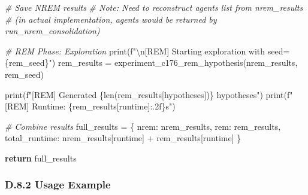 \documentclass[
]{article}
\newenvironment{Shaded}{}{}
\newcommand{\BuiltInTok}[1]{\textcolor[rgb]{0.00,0.50,0.00}{#1}}
\newcommand{\CharTok}[1]{\textcolor[rgb]{0.25,0.44,0.63}{#1}}
\newcommand{\CommentTok}[1]{\textcolor[rgb]{0.38,0.63,0.69}{\textit{#1}}}
\newcommand{\ControlFlowTok}[1]{\textcolor[rgb]{0.00,0.44,0.13}{\textbf{#1}}}
\newcommand{\NormalTok}[1]{#1}
\newcommand{\OperatorTok}[1]{\textcolor[rgb]{0.40,0.40,0.40}{#1}}
\newcommand{\SpecialCharTok}[1]{\textcolor[rgb]{0.25,0.44,0.63}{#1}}
\newcommand{\SpecialStringTok}[1]{\textcolor[rgb]{0.73,0.40,0.53}{#1}}
\newcommand{\StringTok}[1]{\textcolor[rgb]{0.25,0.44,0.63}{#1}}
\begin{document}
\begin{Shaded}
\begin{Highlighting}[]
    \CommentTok{\# Save NREM results}
    \CommentTok{\# Note: Need to reconstruct agents list from nrem\_results}
    \CommentTok{\# (in actual implementation, agents would be returned by run\_nrem\_consolidation)}

    \CommentTok{\# REM Phase: Exploration}
    \BuiltInTok{print}\NormalTok{(}\SpecialStringTok{f"}\CharTok{\textbackslash{}n}\SpecialStringTok{[REM] Starting exploration with seed=}\SpecialCharTok{\{}\NormalTok{rem\_seed}\SpecialCharTok{\}}\SpecialStringTok{"}\NormalTok{)}
\NormalTok{    rem\_results }\OperatorTok{=}\NormalTok{ experiment\_c176\_rem\_hypothesis(nrem\_results, rem\_seed)}

    \BuiltInTok{print}\NormalTok{(}\SpecialStringTok{f"[REM] Generated }\SpecialCharTok{\{}\BuiltInTok{len}\NormalTok{(rem\_results[}\StringTok{\textquotesingle{}hypotheses\textquotesingle{}}\NormalTok{])}\SpecialCharTok{\}}\SpecialStringTok{ hypotheses"}\NormalTok{)}
    \BuiltInTok{print}\NormalTok{(}\SpecialStringTok{f"[REM] Runtime: }\SpecialCharTok{\{}\NormalTok{rem\_results[}\StringTok{\textquotesingle{}runtime\textquotesingle{}}\NormalTok{]}\SpecialCharTok{:.2f\}}\SpecialStringTok{s"}\NormalTok{)}

    \CommentTok{\# Combine results}
\NormalTok{    full\_results }\OperatorTok{=}\NormalTok{ \{}
        \StringTok{\textquotesingle{}nrem\textquotesingle{}}\NormalTok{: nrem\_results,}
        \StringTok{\textquotesingle{}rem\textquotesingle{}}\NormalTok{: rem\_results,}
        \StringTok{\textquotesingle{}total\_runtime\textquotesingle{}}\NormalTok{: nrem\_results[}\StringTok{\textquotesingle{}runtime\textquotesingle{}}\NormalTok{] }\OperatorTok{+}\NormalTok{ rem\_results[}\StringTok{\textquotesingle{}runtime\textquotesingle{}}\NormalTok{]}
\NormalTok{    \}}

    \ControlFlowTok{return}\NormalTok{ full\_results}
\end{Highlighting}
\end{Shaded}

\subsubsection{D.8.2 Usage Example}\label{d.8.2-usage-example}
\end{document}

